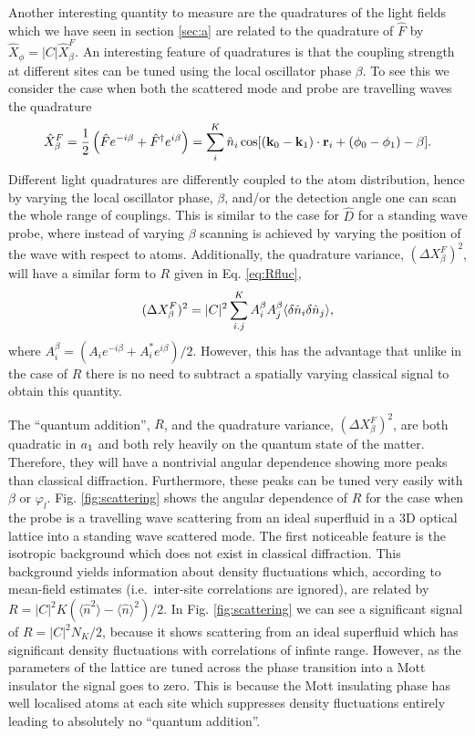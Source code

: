 Another interesting quantity to measure are the quadratures of the
light fields which we have seen in section \ref{sec:a} are related to
the quadrature of $\hat{F}$ by $\hat{X}_\phi = |C|
\hat{X}^F_\beta$. An interesting feature of quadratures is that the
coupling strength at different sites can be tuned using the local
oscillator phase $\beta$. To see this we consider the case when both
the scattered mode and probe are travelling waves the quadrature
\begin{equation} 
  \label{eq:Xtrav}
  \hat{X}^F_\beta = \frac{1}{2} \left( \hat{F} e^{-i \beta} +
    \hat{F}^\dagger e^{i \beta} \right) = \sum_i^K \hat{n}_i\cos[(\mathbf{k}_0 - \mathbf{k}_1) \cdot
  \mathbf{r}_i + (\phi_0 - \phi_1) - \beta].
\end{equation} 
Different light quadratures are differently coupled to the atom
distribution, hence by varying the local oscillator phase, $\beta$,
and/or the detection angle one can scan the whole range of
couplings. This is similar to the case for $\hat{D}$ for a standing
wave probe, where instead of varying $\beta$ scanning is achieved by
varying the position of the wave with respect to atoms. Additionally,
the quadrature variance, $(\Delta X^F_\beta)^2$, will have a similar
form to $R$ given in Eq. \eqref{eq:Rfluc},
\begin{equation}
  (\Delta X^F_\beta)^2 = |C|^2 \sum_{i.j}^K A_i^\beta A_j^\beta
  \langle \delta \hat{n}_i \delta \hat{n}_j \rangle,
\end{equation}
where $A_i^\beta = (A_i e^{-i\beta} + A_i^* e^{i \beta})/2$.  However,
this has the advantage that unlike in the case of $R$ there is no need
to subtract a spatially varying classical signal to obtain this
quantity.

The ``quantum addition'', $R$, and the quadrature variance,
$(\Delta X^F_\beta)^2$, are both quadratic in $a_1$ and both rely
heavily on the quantum state of the matter. Therefore, they will have
a nontrivial angular dependence showing more peaks than classical
diffraction. Furthermore, these peaks can be tuned very easily with
$\beta$ or $\varphi_l$. Fig. \ref{fig:scattering} shows the angular
dependence of $R$ for the case when the probe is a travelling wave
scattering from an ideal superfluid in a 3D optical lattice into a
standing wave scattered mode. The first noticeable feature is the
isotropic background which does not exist in classical
diffraction. This background yields information about density
fluctuations which, according to mean-field estimates (i.e.~inter-site
correlations are ignored), are related by
$R = |C|^2 K( \langle \hat{n}^2 \rangle - \langle \hat{n} \rangle^2
)/2$. In Fig. \ref{fig:scattering} we can see a significant signal of
$R = |C|^2 N_K/2$, because it shows scattering from an ideal
superfluid which has significant density fluctuations with
correlations of infinte range. However, as the parameters of the
lattice are tuned across the phase transition into a Mott insulator
the signal goes to zero. This is because the Mott insulating phase has
well localised atoms at each site which suppresses density
fluctuations entirely leading to absolutely no ``quantum addition''.

